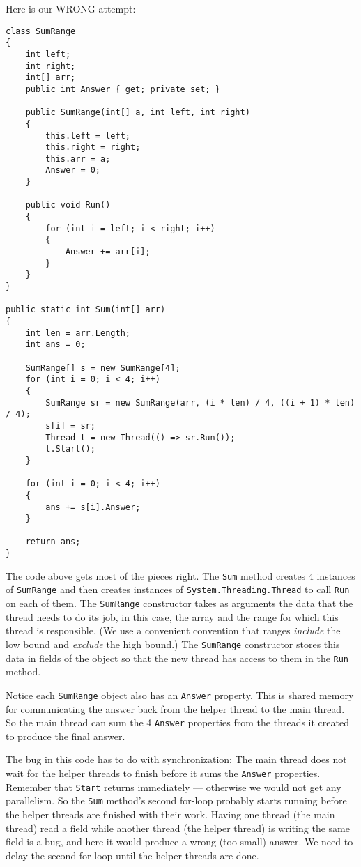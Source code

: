 \documentclass[10pt]{article}
\begin{document}
Here is our WRONG attempt:
\begin{verbatim}
class SumRange
{
    int left;
    int right;
    int[] arr;
    public int Answer { get; private set; }

    public SumRange(int[] a, int left, int right)
    {
        this.left = left;
        this.right = right;
        this.arr = a;
        Answer = 0;
    }

    public void Run()
    {
        for (int i = left; i < right; i++)
        {
            Answer += arr[i];
        }
    }
}

public static int Sum(int[] arr)
{
    int len = arr.Length;
    int ans = 0;

    SumRange[] s = new SumRange[4];
    for (int i = 0; i < 4; i++)
    {
        SumRange sr = new SumRange(arr, (i * len) / 4, ((i + 1) * len) / 4);
        s[i] = sr;
        Thread t = new Thread(() => sr.Run());
        t.Start();
    }

    for (int i = 0; i < 4; i++)
    {
        ans += s[i].Answer;
    }

    return ans;
}
\end{verbatim}

The code above gets most of the pieces right.  The {\tt Sum} method
creates 4 instances of {\tt SumRange} and then creates instances of
{\tt System.Threading.Thread} to call {\tt Run} on each of them.
The {\tt SumRange} constructor takes as arguments the data that the
thread needs to do its job, in this case, the array and the range for
which this thread is responsible.  (We use a convenient convention that
ranges \emph{include} the low bound and \emph{exclude} the high
bound.)  The {\tt SumRange} constructor stores this data in fields of
the object so that the new thread has access to them in the {\tt Run}
method.

Notice each {\tt SumRange} object also has an {\tt Answer} property. 
This is shared memory for communicating the answer back from the helper 
thread to the main thread. So the main thread can sum the 4 {\tt Answer} 
properties from the threads it created to produce the final answer.

The bug in this code has to do with synchronization: The main thread
does not wait for the helper threads to finish before it sums the
{\tt Answer} properties.  Remember that {\tt Start} returns immediately ---
otherwise we would not get any parallelism.  So the {\tt Sum} method's
second for-loop probably starts running before the helper threads are
finished with their work.  Having one thread (the main thread) read a
field while another thread (the helper thread) is writing the same
field is a bug, and here it would produce a wrong (too-small)
answer.  We need to delay the second for-loop until the helper
threads are done.
\end{document}
